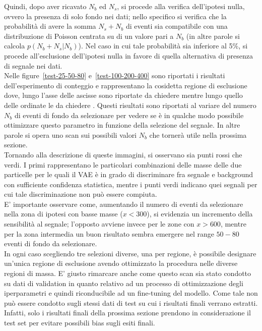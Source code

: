 Quindi, dopo aver ricavato $N_b$ ed $N_s$, si procede alla verifica dell'ipotesi nulla, ovvero la presenza di solo fondo nei dati; nello specifico si verifica che la probabilità di avere la somma $N_s + N_b$ di eventi sia compatibile con una distribuzione di Poisson centrata su di un valore pari a $N_b$ (in altre parole si calcola $p(N_b + N_s | N_b)$). Nel caso in cui tale probabilità sia inferiore al 5\%, si procede all'esclusione dell'ipotesi nulla in favore di quella alternativa di presenza di segnale nei dati.\\
Nelle figure~\ref{test-25-50-80} e~\ref{test-100-200-400} sono riportati i risultati dell'esperimento di conteggio e rappresentano la cosidetta regione di esclusione dove, lungo l'asse delle ascisse sono riportate \color{red} da chiedere \color{black} mentre lungo quello delle ordinate le \color{red} da chiedere \color{black}. Questi risultati sono riportati al variare del numero $N_{b}$ di eventi di fondo da selezionare per vedere se è in qualche modo possibile ottimizzare questo parametro in funzione della selezione del segnale. In altre parole si opera uno scan sui possibili valori $N_{b}$ che tornerà utile nella prossima sezione.\\
Tornando alla descrizione di queste immagini, si osservano sia punti rossi che verdi. I primi rappresentano le particolari combinazioni delle masse delle due particelle per le quali il VAE è in grado di discriminare fra segnale e background con sufficiente confidenza statistica, mentre i punti verdi indicano  quei segnali per cui tale discriminazione non può essere compiuta.\\
E' importante osservare come, aumentando il numero di eventi da selezionare nella zona di ipotesi con basse masse ($x < 300$), si evidenzia un incremento della sensibilità al segnale; l'opposto avviene invece per le zone con $x > 600$, mentre per la zona intermedia un buon risultato sembra emergere nel range $50 - 80$ eventi di fondo da selezionare.\\
In ogni caso scegliendo tre selezioni diverse, una per regione, è possibile designare un'unica regione di esclusione avendo ottimizzato la procedura nelle diverse regioni di massa. E' giusto rimarcare anche come questo scan sia stato condotto su dati di validation in quanto relativo ad un processo di ottimizzazione degli iperparametri e quindi riconducibile ad un fine-tuning del modello. Come tale non può essere condotto sugli stessi dati di test su cui i risultati finali verrano estratti. Infatti, solo i risultati finali della prossima sezione prendono in considerazione il test set per evitare possibili bias sugli esiti finali.

